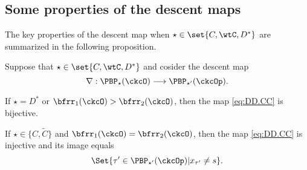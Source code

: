 \documentclass[ssunip]{subfiles}
\begin{document}
\subsection{Some properties of the descent maps}





The key properties of the descent map when $\star\in \set{C,\wtC,D^*}$ are summarized in the following proposition.

\begin{prop}\label{prop:CC.bij}
Suppose that $\star \in \set{C,\wtC,D^*}$ and cosider the
descent map
\begin{equation}\label{eq:DD.CC}
\nabla: \PBP_\star(\ckcO)\longrightarrow  \PBP_{\star'}(\ckcOp).
\end{equation}
\begin{enuma}
\item If
$\star=D^*$ or $\bfrr_1(\ckcO)>\bfrr_2(\ckcO)$, then
the map \eqref{eq:DD.CC}  is bijective.

\item If  $\star\in \{C,\widetilde C\}$ and $\bfrr_1(\ckcO)=\bfrr_2(\ckcO)$, then the  map \eqref{eq:DD.CC} is injective and its image equals
\[
\Set{\tau'\in \PBP_{\star'}(\ckcOp)| x_{\tau'}\neq s}.
\]
\end{enuma}
\end{prop}
\end{document}
